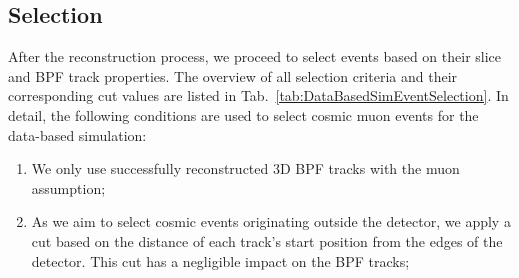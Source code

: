 \subsection*{Selection}\label{sec:DataBasedSimSelection}
After the reconstruction process, we proceed to select events based on their slice and \gls{BPF} track properties. The overview of all selection criteria and their corresponding cut values are listed in Tab.~\ref{tab:DataBasedSimEventSelection}. In detail, the following conditions are used to select cosmic muon events for the data-based simulation:
\begin{enumerate}
\item We only use successfully reconstructed 3D \gls{BPF} tracks with the muon assumption;
\item As we aim to select cosmic events originating outside the detector, we apply a cut based on the distance of each track's start position from the edges of the detector. This cut has a negligible impact on the \gls{BPF} tracks;


\end{enumerate}
